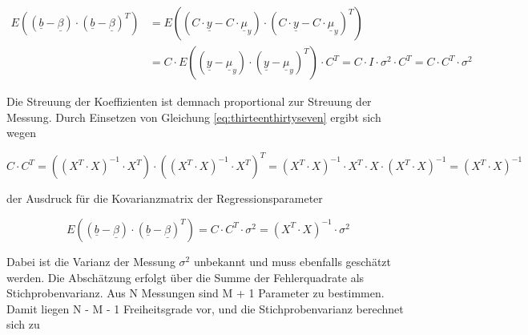 \begin{equation}\label{eq:thirteenthirtyeight}
\begin{split}
E\left(\left(\underline{b}-\underline{\beta }\right)\cdot \left(\underline{b}-\underline{\beta }\right)^{T} \right) & =E\left(\left(C\cdot \underline{y}-C\cdot \underline{\mu }_{y} \right)\cdot \left(C\cdot \underline{y}-C\cdot \underline{\mu }_{y} \right)^{T} \right) \\ 
& = C\cdot E\left(\left(\underline{y}-\underline{\mu }_{y} \right)\cdot \left(\underline{y}-\underline{\mu }_{y} \right)^{T} \right)\cdot C^{T} =C\cdot I\cdot \sigma ^{2} \cdot C^{T} =C\cdot C^{T} \cdot \sigma ^{2}
\end{split}
\end{equation}

\noindent Die Streuung der Koeffizienten ist demnach proportional zur Streuung der Messung. Durch Einsetzen von Gleichung \eqref{eq:thirteenthirtyseven} ergibt sich wegen 

\begin{equation}\label{eq:thirteenthirtynine}
C\cdot C^{T} =\left(\left(X^{T} \cdot X\right)^{-1} \cdot X^{T} \right)\cdot \left(\left(X^{T} \cdot X\right)^{-1} \cdot X^{T} \right)^{T} =\left(X^{T} \cdot X\right)^{-1} \cdot X^{T} \cdot X\cdot \left(X^{T} \cdot X\right)^{-1} =\left(X^{T} \cdot X\right)^{-1}
\end{equation}

\noindent der Ausdruck f\"{u}r die Kovarianzmatrix der Regressionsparameter

\begin{equation}\label{eq:thirteenfourty}
E\left(\left(\underline{b}-\underline{\beta }\right)\cdot \left(\underline{b}-\underline{\beta }\right)^{T} \right)=C\cdot C^{T} \cdot \sigma ^{2} =\left(X^{T} \cdot X\right)^{-1} \cdot \sigma ^{2}
\end{equation}

\noindent Dabei ist die Varianz der Messung $\sigma^{2}$ unbekannt und muss ebenfalls gesch\"{a}tzt werden. Die Absch\"{a}tzung erfolgt \"{u}ber die Summe der Fehlerquadrate als Stichprobenvarianz. Aus N Messungen sind M + 1 Parameter zu bestimmen. Damit liegen N - M - 1 Freiheitsgrade vor, und die Stichprobenvarianz berechnet sich zu

